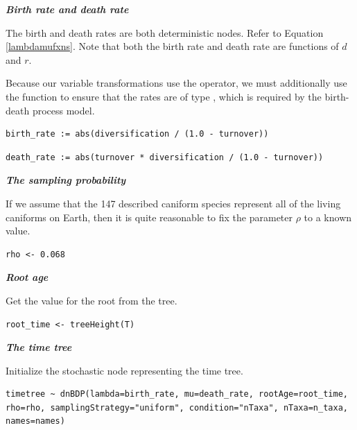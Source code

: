 \textbf{\textit{Birth rate and death rate}}

The birth and death rates are both deterministic nodes. 
Refer to Equation \ref{lambdamufxns}. Note that both the birth rate and death rate are functions of $d$ and $r$.

Because our variable transformations use the \cl{-} operator, we must additionally use the  function to ensure that the rates are of type , which is required by the birth-death process model.
{\tt \begin{snugshade*}
\begin{lstlisting}
birth_rate := abs(diversification / (1.0 - turnover))
\end{lstlisting}
\end{snugshade*}}

{\tt \begin{snugshade*}
\begin{lstlisting}
death_rate := abs(turnover * diversification / (1.0 - turnover))
\end{lstlisting}
\end{snugshade*}}

\textbf{\textit{The sampling probability}}

If we assume that the 147 described caniform species represent all of the living caniforms on Earth, then it is quite reasonable to fix the parameter $\rho$ to a known value.
{\tt \begin{snugshade*}
\begin{lstlisting}
rho <- 0.068
\end{lstlisting}
\end{snugshade*}}

\textbf{\textit{Root age}}

Get the value for the root from the \citet{dosReis2012} tree.

{\tt \begin{snugshade*}
\begin{lstlisting}
root_time <- treeHeight(T)
\end{lstlisting}
\end{snugshade*}}

\textbf{\textit{The time tree}}

Initialize the stochastic node representing the time tree.
{\tt \begin{snugshade*}
\begin{lstlisting}
timetree ~ dnBDP(lambda=birth_rate, mu=death_rate, rootAge=root_time, rho=rho, samplingStrategy="uniform", condition="nTaxa", nTaxa=n_taxa, names=names)
\end{lstlisting}
\end{snugshade*}}

